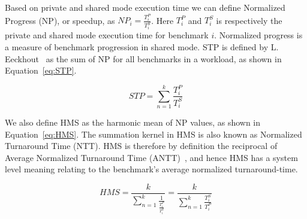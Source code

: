Based on private and shared mode execution time we can define Normalized Progress (NP), or speedup, as ${NP}_i = \frac{T^{P}_i}{T^{S}_i}$.
Here $T^{P}_i$ and $T^{S}_i$ is respectively the private and shared mode execution time for benchmark $i$.
Normalized progress is a measure of benchmark progression in shared mode.
STP is defined by L. Eeckhout~\cite{Eeckhout2010} as the sum of NP for all benchmarks in a workload, as shown in Equation~\ref{eq:STP}.

\begin{equation} \label{eq:STP} 
 {STP} = {\sum\limits_{n=1}^{k}}\frac{T^{P}_i}{T^{S}_i}
\end{equation}

We also define HMS as the harmonic mean of NP values, as shown in Equation~\ref{eq:HMS}.
The summation kernel in HMS is also known as Normalized Turnaround Time (NTT).
HMS is therefore by definition the reciprocal of Average Normalized Turnaround Time (ANTT)~\cite{Eeckhout2010}, and hence HMS has a system level meaning relating to the benchmark's average normalized turnaround-time.

\begin{equation} \label{eq:HMS}
 {HMS} = \frac{k}{{\sum\limits_{n=1}^{k}\frac{1}{\frac{T^{P}_i}{T^{S}_i}}}} = \frac{k}{{\sum\limits_{n=1}^{k}\frac{T^{S}_i}{T^{P}_i}}}
\end{equation}

